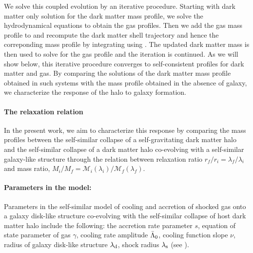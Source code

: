We solve this coupled evolution by an iterative procedure. Starting with dark matter only solution for the dark matter mass profile, we solve the hydrodynamical equations to obtain the gas profiles. Then we add the gas mass profile to  and recompute the dark matter shell trajectory and hence the correponding mass profile by integrating using . The updated dark matter mass is then used to solve for the gas profile and the iteration is continued. As we will show below, this iterative procedure converges to self-consistent profiles for dark matter and gas. By comparing the solutions of the dark matter mass profile obtained in such systems with the mass profile obtained in the absence of galaxy, we characterize the response of the halo to galaxy formation.

\paragraph{The relaxation relation}
\label{sec:methods-relx-reln-ch:ssr}
In the present work, we aim to characterize this response by comparing the mass profiles between the self-similar collapse of a self-gravitating dark matter halo and the self-similar collapse of a dark matter halo co-evolving with a self-similar galaxy-like structure through the relation between relaxation ratio 
$r_f/r_i=\lambda_f/\lambda_i$ and mass ratio, $M_i/M_f=\mathcal{M}_i(\lambda_i)/\mathcal{M}_f(\lambda_f)$.



\paragraph{Parameters in the model:}
Parameters in the self-similar model of cooling and accretion of shocked gas onto a galaxy disk-like structure co-evolving with the self-similar collapse of host dark matter halo include the following:
the accretion rate parameter $s$, equation of state parameter of gas $\gamma$, cooling rate amplitude $\Bar{\Lambda}_0$, cooling function slope $\nu$, radius of galaxy disk-like structure $\lambda_{\rm d}$, shock radius $\lambda_{\rm s}$ (see ).


